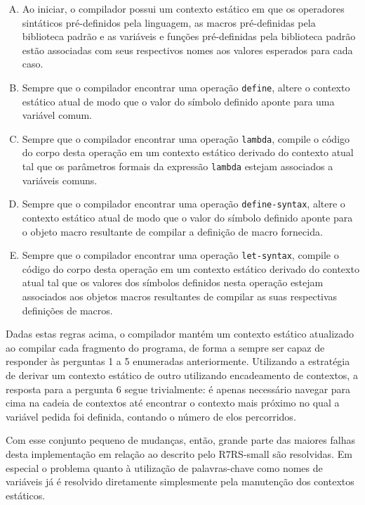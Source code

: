 \begin{enumerate}[(A)]

\item Ao iniciar, o compilador possui um contexto estático em que os operadores
sintáticos pré-definidos pela linguagem, as macros pré-definidas pela
biblioteca padrão e as variáveis e funções pré-definidas pela biblioteca padrão
estão associadas com seus respectivos nomes aos valores esperados para cada
caso.

\item Sempre que o compilador encontrar uma operação \texttt{define}, altere o contexto
estático atual de modo que o valor do símbolo definido aponte para uma variável
comum.

\item Sempre que o compilador encontrar uma operação \texttt{lambda}, compile o código
do corpo desta operação em um contexto estático derivado do contexto atual tal
que os parâmetros formais da expressão \texttt{lambda} estejam associados a variáveis
comuns.

\item Sempre que o compilador encontrar uma operação \texttt{define-syntax}, altere o
contexto estático atual de modo que o valor do símbolo definido aponte para o
objeto macro resultante de compilar a definição de macro fornecida.

\item Sempre que o compilador encontrar uma operação \texttt{let-syntax}, compile o
código do corpo desta operação em um contexto estático derivado do contexto
atual tal que os valores dos símbolos definidos nesta operação estejam
associados aos objetos macros resultantes de compilar as suas respectivas
definições de macros.

\end{enumerate}

Dadas estas regras acima, o compilador mantém um contexto estático atualizado
ao compilar cada fragmento do programa, de forma a sempre ser capaz de
responder às perguntas 1 a 5 enumeradas anteriormente. Utilizando a estratégia
de derivar um contexto estático de outro utilizando encadeamento de contextos,
a resposta para a pergunta 6 segue trivialmente: é apenas necessário navegar
para cima na cadeia de contextos até encontrar o contexto mais próximo no qual
a variável pedida foi definida, contando o número de elos percorridos.

Com esse conjunto pequeno de mudanças, então, grande parte das maiores falhas
desta implementação em relação ao descrito pelo \acs{R7RS}-small são
resolvidas.  Em especial o problema quanto à utilização de palavras-chave como
nomes de variáveis já é resolvido diretamente simplesmente pela manutenção dos
contextos estáticos.
